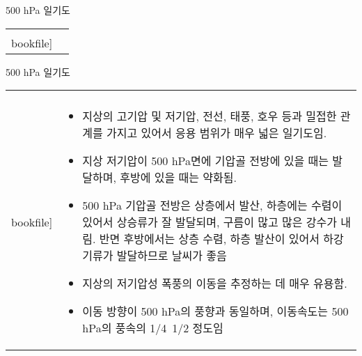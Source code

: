 \begin{frame}[t]{500 hPa 일기도}
	\begin{tabular}{ll}
		\begin{minipage}[t]{0.9\textwidth}\scriptsize
			\begin{figure}[t]
				\texttt{[image: \\bookfile]}
			\end{figure}
		\end{minipage}	
		&
		\begin{minipage}[t]{0.05\textwidth} \scriptsize	
			
		\end{minipage}
	\end{tabular}
\end{frame}


\begin{frame}[t]{500 hPa 일기도}
	\begin{tabular}{ll}
		\begin{minipage}[t]{0.3\textwidth}\scriptsize
			\begin{figure}[t]
				\texttt{[image: \\bookfile]}
			\end{figure}
		\end{minipage}	
		&
		\begin{minipage}[t]{0.65\textwidth} \scriptsize	
			\begin{itemize}
				\item 지상의 고기압 및 저기압, 전선, 태풍, 호우 등과 밀접한 관계를 가지고 있어서 응용 범위가 매우 넓은 일기도임.
				\item 지상 저기압이 500 hPa면에 기압골 전방에 있을 때는 발달하며, 후방에 있을 때는 약화됨.
				\item 500 hPa 기압골 전방은 상층에서 발산, 하층에는 수렴이 있어서 상승류가 잘 발달되며, 구름이 많고 많은 강수가 내림. 반면 후방에서는 상층 수렴, 하층 발산이 있어서 하강기류가 발달하므로 날씨가 좋음
				\item 지상의 저기압성 폭풍의 이동을 추정하는 데 매우 유용함. 
				\item 이동 방향이 500 hPa의 풍향과 동일하며, 이동속도는 500 hPa의 풍속의 1/4~1/2 정도임
				
			\end{itemize}

		\end{minipage}
	\end{tabular}
\end{frame}




